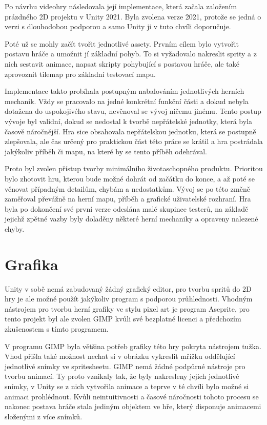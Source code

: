 \documentclass[FM,Proj]{tulthesis}
\begin{document}
	Po návrhu videohry následovala její implementace, která začala založením prázdného 2D projektu v Unity 2021. Byla zvolena verze 2021, protože se jedná o verzi s dlouhodobou podporou a samo Unity ji v tuto chvíli doporučuje.
	
	Poté už se mohly začít tvořit jednotlivé assety. Prvním cílem bylo vytvořit postavu hráče a umožnit jí základní pohyb. To si vyžadovalo nakreslit sprity a z nich sestavit animace, napsat skripty pohybující s postavou hráče, ale také zprovoznit tilemap pro základní testovací mapu.
	
	Implementace takto probíhala postupným nabalováním jednotlivých herních mechanik. Vždy se pracovalo na jedné konkrétní funkční části a dokud nebyla dotažena do uspokojivého stavu, nevěnoval se vývoj ničemu jinému. Tento postup vývoje byl validní, dokud se nedostal k tvorbě nepřátelské jednotky, která byla časově náročnější. Hra sice obsahovala nepřátelskou jednotku, která se postupně zlepšovala, ale čas určený pro praktickou část této práce se krátil a hra postrádala jakýkoliv příběh či mapu, na které by se tento příběh odehrával.
	
	Proto byl zvolen přístup tvorby minimálního životaschopného produktu. Prioritou bylo zhotovit hru, kterou bude možné dohrát od začátku do konce, a až poté se věnovat případným detailům, chybám a nedostatkům. Vývoj se po této změně zaměřoval převážně na herní mapu, příběh a grafické uživatelské rozhraní. Hra byla po dokončení své první verze odeslána malé skupince testerů, na základě jejichž zpětné vazby byly doladěny některé herní mechaniky a opraveny nalezené chyby.
	
	\section{Grafika} %
	
	Unity v sobě nemá zabudovaný žádný grafický editor, pro tvorbu spritů do 2D hry je ale možné použít jakýkoliv program s podporou průhlednosti. Vhodným nástrojem pro tvorbu herní grafiky ve stylu pixel art je program Aseprite, pro tento projekt byl ale zvolen GIMP kvůli své bezplatné licenci a předchozím zkušenostem s tímto programem.
	
	V programu GIMP byla většina potřeb grafiky této hry pokryta nástrojem tužka. Vhod přišla také možnost nechat si v obrázku vykreslit mřížku oddělující jednotlivé snímky ve spritesheetu. GIMP nemá žádné podpůrné nástroje pro tvorbu animací. Ty proto vznikaly tak, že byly nakresleny jejich jednotlivé snímky, v Unity se z nich vytvořila animace a teprve v té chvíli bylo možné si animaci prohlédnout. Kvůli neintuitivnosti a časové náročnosti tohoto procesu se nakonec postava hráče stala jediným objektem ve hře, který disponuje animacemi složenými z více snímků.
	
\end{document}
